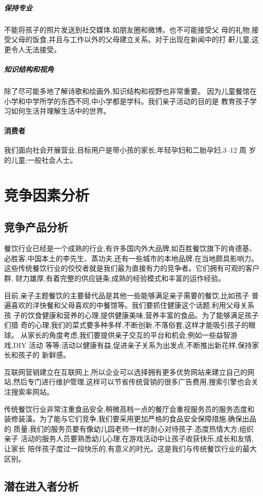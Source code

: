 \subparagraph{ 保持专业 }
不能将孩子的照片发送到社交媒体,如朋友圈和微博。也不可能接受父
母的礼物,接受父母的饭食,并且与工作以外的父母建立关系。对于出现在新闻中的打
鼾儿童,这更令人无法接受。

\subparagraph{ 知识结构和视角 }
除了尽可能多地了解诗歌和绘画外,知识结构和视野也非常重要。
因为儿童餐馆在小学和中学所学的东西不同,中小学都是学科。我们亲子活动的目的是
教育孩子学习如何生活并理解生活中的世界。

\paragraph{消费者}
我们面向社会开展营业,目标用户是带小孩的家长,年轻孕妇和二胎孕妇,3--12 周
岁的儿童;一般社会人士。

\section{竞争因素分析}
\subsection{竞争产品分析}
餐饮行业已经是一个成熟的行业,有许多国内外大品牌,如百胜餐饮旗下的肯德基、
必胜客,中国本土的李先生、蒸功夫,还有一些城市的本地品牌,在当地颇具影响力。
这些传统餐饮行业的佼佼者就是我们最为直接有力的竞争者。它们拥有可观的客户群,
财力雄厚,有着完整的供应链条,成熟的经验模式和丰富的运作经验。

目前,亲子主题餐饮的主要替代品是其他一些能够满足亲子需要的餐饮,比如孩子
普遍喜欢的洋快餐和父母喜欢的中餐馆等。我们要抓住健康这个话题,利用父母关系孩
子的饮食健康和营养的心理,提供健康美味,营养丰富的食品。为了能够满足孩子们猎
奇的心理,我们的菜式要多种多样,不断创新,不落俗套,这样才能吸引孩子的眼球。
从家长的角度考虑,我们要提供亲子交互的平台和机会,例如一些益智游戏,DIY 活动
等等;活动以健康有益,促进亲子关系为出发点,不断推出新花样,保持家长和孩子的
新鲜感。

互联网营销建立在互联网上,所以企业可以选择拥有更多优势网站来建立自己的网
站,然后专门进行维护管理,这样可以节省传统营销的很多广告费用,搜索引擎也会关
注搜索率网站。

传统餐饮行业非常注重食品安全,稍微高档一点的餐厅会重视服务员的服务态度和
装修装潢。为了能与它们竞争,我们要采用更加严格的食品安全保障措施,确保出品的
质量;我们的服务员要有像幼儿园老师一样的耐心对待孩子,态度热情大方;组织亲子
活动的服务人员要熟悉幼儿心理,在游戏活动中让孩子收获快乐,成长和友情,让家长
陪伴孩子度过一段快乐的,有意义的时光。这是我们与传统餐饮行业的最大区别。

\subsection{潜在进入者分析}


